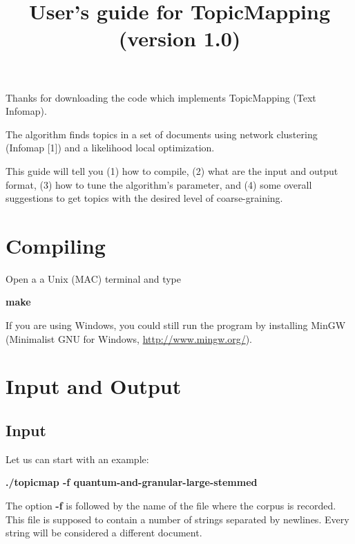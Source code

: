 \documentclass[11pt]{article}
\title{User's guide for TopicMapping (version 1.0)}
\begin{document}
\maketitle



Thanks for downloading the code which implements TopicMapping (Text Infomap).

The algorithm finds topics in a set of documents using network clustering (Infomap [1]) 
and a likelihood local optimization.


This guide will tell you (1) how to compile, (2) what are the input and output format, (3) how to tune the algorithm's parameter, and (4) some overall suggestions to get topics with the desired level of coarse-graining. 
 



\tableofcontents

\newpage

\section{Compiling}


Open  a a Unix (MAC) terminal and type  

\textbf{make}

If you are using Windows, you could still run
the program by installing MinGW
(Minimalist GNU for Windows, \url{http://www.mingw.org/}).


\section{Input and Output}

\subsection{Input}
Let us can start with an example:

\textbf{./topicmap -f quantum-and-granular-large-stemmed}

The option \textbf{-f} is followed by the name of the file where the corpus is recorded. This file is supposed 
to contain a number of strings separated by newlines. Every string will be considered a different document.
\end{document}
